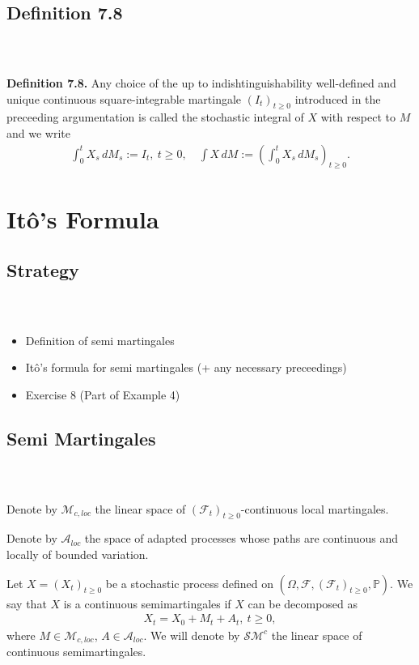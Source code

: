 \documentclass{beamer}
\numberwithin{equation}{section}
\newenvironment{frame2}{\begin{frame}\frametitle{{\normalsize \secname} \\ {\large \subsecname}}}{\end{frame}}
\begin{document}
\subsection{Definition 7.8}

\begin{frame2}
    \textbf{Definition 7.8.}
    Any choice of the up to indishtinguishability well-defined and unique continuous square-integrable martingale $(I_t)_{t \geq 0}$ introduced in the preceeding argumentation is called the stochastic integral of $X$ with respect to $M$ and we write
    \begin{align*}
        \int_0^t X_s \, dM_s := I_t, \ t \geq 0, \quad \int X \, dM := \left(\int_0^t X_s \, d M_s \right)_{t\geq 0}.
    \end{align*}    
\end{frame2}

\section{Itô's Formula}

\subsection{Strategy}
\begin{frame2}
    \begin{itemize}
        \item Definition of semi martingales
        \item Itô's formula for semi martingales (+ any necessary preceedings)
        \item Exercise 8 (Part of Example 4)
    \end{itemize}
\end{frame2}

\subsection{Semi Martingales}

\begin{frame2}
    Denote by $\mathcal{M}_{c,loc}$ the linear space of $(\mathcal{F}_t)_{t \geq 0}$-continuous local martingales.
    
    \vspace{10pt}
    Denote by $\mathcal{A}_{loc}$ the space of adapted processes whose paths are continuous and locally of bounded variation.

    \vspace{10pt}
    Let $X = (X_t)_{t \geq 0}$ be a stochastic process defined on $(\Omega, \mathcal{F},(\mathcal{F}_t)_{t \geq 0}, \mathbb{P})$.
    We say that $X$ is a continuous semimartingales if $X$ can be decomposed as
    \begin{align}
        X_t = X_0 + M_t + A_t, \ t \geq 0,
    \end{align}
    where $M \in \mathcal{M}_{c,loc}$, $A \in \mathcal{A}_{loc}$.
    We will denote by $\mathcal{SM}^c$ the linear space of continuous semimartingales.
\end{frame2}
\end{document}
